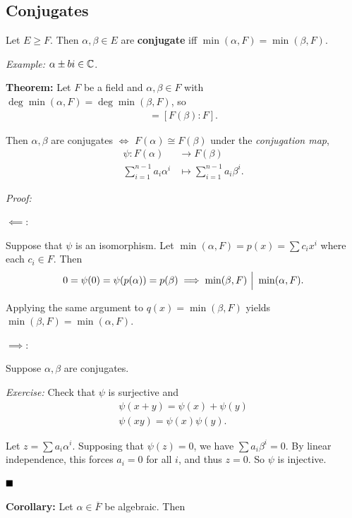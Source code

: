 \hypertarget{conjugates}{%
\subsection{Conjugates}\label{conjugates}}

Let \(E\geq F\). Then \(\alpha, \beta \in E\) are \textbf{conjugate} iff
\(\min(\alpha, F) = \min(\beta, F)\).

\emph{Example:} \(\alpha \pm bi \in {\mathbb{C}}\).

\textbf{Theorem:} Let \(F\) be a field and \(\alpha, \beta \in F\) with
\(\deg \min (\alpha, F) = \deg \min (\beta, F)\), so \begin{align*}
[F(\alpha): F] = [F(\beta): F]
.\end{align*}

Then \(\alpha, \beta\) are conjugates \(\iff\)
\(F(\alpha) \cong F(\beta)\) under the \emph{conjugation map},
\begin{align*}
\psi: F(\alpha) &\to F(\beta) \\
\sum_{i=1}^{n-1} a_i \alpha^i &\mapsto \sum_{i=1}^{n-1} a_i \beta^i
.\end{align*}

\emph{Proof:}

\(\impliedby\):

Suppose that \(\psi\) is an isomorphism. Let
\(\min(\alpha, F) = p(x) = \sum c_i x^i\) where each \(c_i \in F\). Then
\begin{align*}
0 = \psi(0) = \psi(p(\alpha)) = p(\beta) \implies \min(\beta, F) {~\Bigm| ~} \min(\alpha, F)
.\end{align*}

Applying the same argument to \(q(x) = \min(\beta, F)\) yields
\(\min(\beta, F) = \min(\alpha, F)\).

\(\implies\):

Suppose \(\alpha, \beta\) are conjugates.

\emph{Exercise:} Check that \(\psi\) is surjective and \begin{align*}
\psi(x+y) = \psi(x) + \psi(y) \\
\psi(xy) = \psi(x) \psi(y)
.\end{align*}

Let \(z = \sum a_i \alpha^i\). Supposing that \(\psi(z) = 0\), we have
\(\sum a_i \beta^i = 0\). By linear independence, this forces
\(a_i = 0\) for all \(i\), and thus \(z=0\). So \(\psi\) is injective.

\(\qed\)

\textbf{Corollary:} Let \(\alpha \in \overline F\) be algebraic. Then

